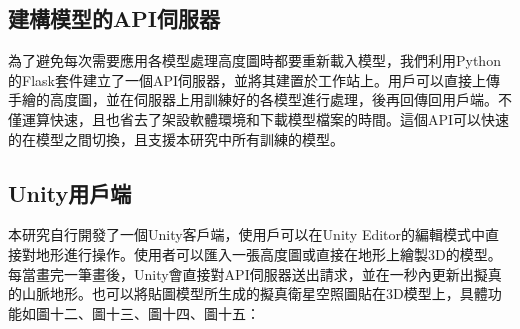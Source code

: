 \documentclass[a4paper, 12pt]{article}
\begin{document}
\subsection{建構模型的API伺服器}
為了避免每次需要應用各模型處理高度圖時都要重新載入模型，我們利用Python的Flask套件建立了一個API伺服器，並將其建置於工作站上。用戶可以直接上傳手繪的高度圖，並在伺服器上用訓練好的各模型進行處理，後再回傳回用戶端。不僅運算快速，且也省去了架設軟體環境和下載模型檔案的時間。這個API可以快速的在模型之間切換，且支援本研究中所有訓練的模型。

\subsection{Unity用戶端}

本研究自行開發了一個Unity客戶端，使用戶可以在Unity Editor的編輯模式中直接對地形進行操作。使用者可以匯入一張高度圖或直接在地形上繪製3D的模型。每當畫完一筆畫後，Unity會直接對API伺服器送出請求，並在一秒內更新出擬真的山脈地形。也可以將貼圖模型所生成的擬真衛星空照圖貼在3D模型上，具體功能如圖十二、圖十三、圖十四、圖十五：
\end{document}
